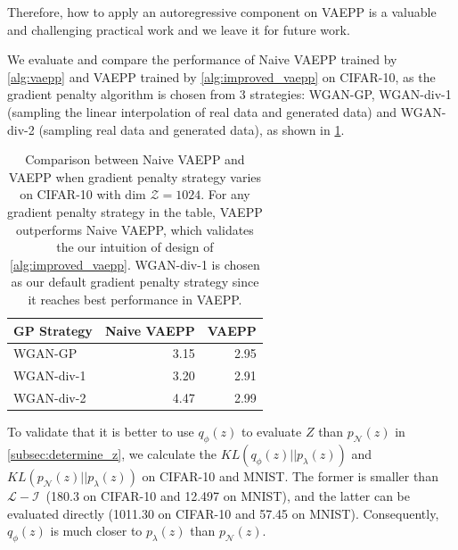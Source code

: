 Therefore, how to apply an autoregressive component on VAEPP is a valuable and challenging practical work and we leave it for future work.

We evaluate and compare the performance of Naive VAEPP trained by \cref{alg:vaepp} and VAEPP trained by \cref{alg:improved_vaepp} on CIFAR-10, as the gradient penalty algorithm is chosen from 3 strategies: WGAN-GP, WGAN-div-1 (sampling the linear interpolation of  real data and generated data) and WGAN-div-2 (sampling real data and generated data), as shown in \cref{tab:compare_nD_over_R}. 
\begin{table}[tb]
\centering
\begin{tabular}{lrr}  
\toprule
GP Strategy  &  Naive VAEPP  & VAEPP \\
\midrule
WGAN-GP      &  3.15   & 2.95      \\
WGAN-div-1   &  3.20   & 2.91      \\
WGAN-div-2   &  4.47   & 2.99      \\
\bottomrule
\end{tabular}
\caption{Comparison between Naive VAEPP and VAEPP when gradient penalty strategy varies on CIFAR-10 with dim $\mathcal{Z} = 1024$. For any gradient penalty strategy in the table, VAEPP outperforms Naive VAEPP, which validates the our intuition of design of \cref{alg:improved_vaepp}.  WGAN-div-1 is chosen as our default gradient penalty strategy since it reaches best performance in VAEPP. 
}
\label{tab:compare_nD_over_R}
\end{table}

To validate that it is better to use $q_\phi(z)$ to evaluate $Z$ than $p_\mathcal{N}(z)$ in \cref{subsec:determine_z}, we calculate the $KL(q_\phi(z)||p_\lambda(z))$ and $KL(p_\mathcal{N}(z)||p_\lambda(z))$ on CIFAR-10 and MNIST. The former is smaller than $\mathcal{L}-\mathcal{I}$~\cite{hoffman2016elbo}(180.3 on CIFAR-10 and 12.497 on MNIST), and the latter can be evaluated directly (1011.30 on CIFAR-10 and 57.45 on MNIST). Consequently, $q_\phi(z)$ is much closer to $p_\lambda(z)$ than $p_\mathcal{N}(z)$. 

